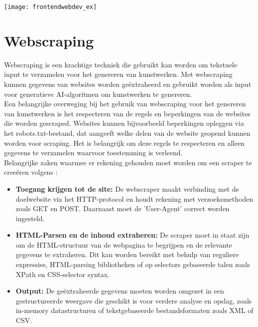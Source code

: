 \begin{center}
    \texttt{[image: frontendwebdev\_ex]}
    \label{fig:frontendwebdev_ex}
\end{center}


\section{Webscraping}
Webscraping is een krachtige techniek die gebruikt kan worden om tekstuele input te verzamelen voor het genereren van kunstwerken. Met webscraping kunnen gegevens van websites worden geëxtraheerd en gebruikt worden als input voor generatieve AI-algoritmen om kunstwerken te genereren. \\
 
Een belangrijke overweging bij het gebruik van webscraping voor het genereren van kunstwerken is het respecteren van de regels en beperkingen van de websites die worden gescraped. Websites kunnen bijvoorbeeld beperkingen opleggen via het robots.txt-bestand, dat aangeeft welke delen van de website geopend kunnen worden voor scraping. Het is belangrijk om deze regels te respecteren en alleen gegevens te verzamelen waarvoor toestemming is verleend. \\

Belangrijke zaken waarmee er rekening gehouden moet worden om een scraper te creeëren volgens \autocite{BIO2014}:

\begin{itemize}
    \item \textbf{Toegang krijgen tot de site:} De webscraper maakt verbinding met de doelwebsite via het HTTP-protocol en houdt rekening met verzoeksmethoden zoals GET en POST. Daarnaast moet de 'User-Agent' correct worden ingesteld.
    \item \textbf{HTML-Parsen en de inhoud extraheren:} De scraper moet in staat zijn om de HTML-structuur van de webpagina te begrijpen en de relevante gegevens te extraheren. Dit kan worden bereikt met behulp van reguliere expressies, HTML-parsing bibliotheken of op selectors gebaseerde talen zoals XPath en CSS-selector syntax.
    \item \textbf{Output:} De geëxtraheerde gegevens moeten worden omgezet in een gestructureerde weergave die geschikt is voor verdere analyse en opslag, zoals in-memory datastructuren of tekstgebaseerde bestandsformaten zoals XML of CSV.
\end{itemize}

